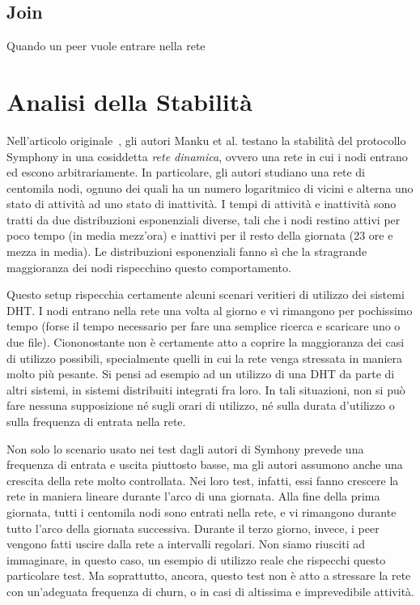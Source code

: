 \documentclass[prodmode,acmtap]{acmlarge}
\begin{document}
\subsection{Join}
Quando un peer vuole entrare nella rete





\section{Analisi della Stabilità} \label{stabilita}

Nell'articolo originale~\cite{symphony}, gli autori Manku et al. testano la stabilità del protocollo Symphony in una cosiddetta \emph{rete dinamica}, ovvero una rete in cui i nodi entrano ed escono arbitrariamente. In particolare, gli autori studiano una rete di centomila nodi, ognuno dei quali ha un numero logaritmico di vicini e alterna uno stato di attività ad uno stato di inattività. I tempi di attività e inattività sono tratti da due distribuzioni esponenziali diverse, tali che i nodi restino attivi per poco tempo (in media mezz'ora) e inattivi per il resto della giornata (23 ore e mezza in media). Le distribuzioni esponenziali fanno sì che la stragrande maggioranza dei nodi rispecchino questo comportamento.

Questo setup rispecchia certamente alcuni scenari veritieri di utilizzo dei sistemi DHT. I nodi entrano nella rete una volta al giorno e vi rimangono per pochissimo tempo (forse il tempo necessario per fare una semplice ricerca e scaricare uno o due file). Ciononostante non è certamente atto a coprire la maggioranza dei casi di utilizzo possibili, specialmente quelli in cui la rete venga stressata in maniera molto più pesante. Si pensi ad esempio ad un utilizzo di una DHT da parte di altri sistemi, in sistemi distribuiti integrati fra loro. In tali situazioni, non si può fare nessuna supposizione né sugli orari di utilizzo, né sulla durata d'utilizzo o sulla frequenza di entrata nella rete.

Non solo lo scenario usato nei test dagli autori di Symhony prevede una frequenza di entrata e uscita piuttosto basse, ma gli autori assumono anche una crescita della rete molto controllata. Nei loro test, infatti, essi fanno crescere la rete in maniera lineare durante l'arco di una giornata. Alla fine della prima giornata, tutti i centomila nodi sono entrati nella rete, e vi rimangono durante tutto l'arco della giornata successiva. Durante il terzo giorno, invece, i peer vengono fatti uscire dalla rete a intervalli regolari. Non siamo riusciti ad immaginare, in questo caso, un esempio di utilizzo reale che rispecchi questo particolare test. Ma soprattutto, ancora, questo test non è atto a stressare la rete con un'adeguata frequenza di churn, o in casi di altissima e imprevedibile attività.
\end{document}
